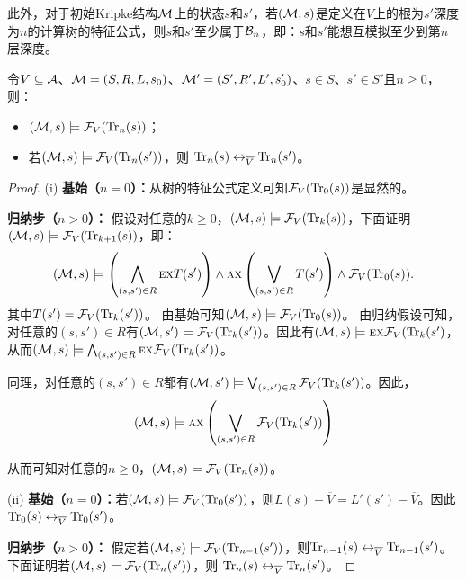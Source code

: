 此外，对于初始Kripke结构${\cal M}$上的状态$s$和$s'$，若$({\cal M},s)$是定义在$V$上的根为$s'$深度为$n$的计算树的特征公式，则$s$和$s'$至少属于${\cal B}_n$，即：$s$和$s'$能想互模拟至少到第$n$层深度。

\begin{lemma}\label{Bn:to:Tn}
	令$V\subseteq {\cal A}$、${\cal M}=(S, R, L,s_0)$、${\cal M}'=(S', R', L',s_0')$、$s\in S$、$s'\in S'$且$n\ge 0$，则：
	\begin{itemize}
		\item[(i)] $({\cal M},s)\models{\cal F}_V(\textrm{Tr}_n(s))$；
		\item[(ii)] 若$({\cal M},s)\models{\cal F}_V(\textrm{Tr}_n(s'))$，则
		$\textrm{Tr}_n(s) \leftrightarrow_{\overline V} \textrm{Tr}_n(s')$。
	\end{itemize}
\end{lemma}
\begin{proof}
	(i) \textbf{基始（$n=0$）：}从树的特征公式定义可知${\cal F}_V(\textrm{Tr}_0(s))$是显然的。
	
	\textbf{归纳步（$n>0$）：} 假设对任意的$k\geq 0$，$({\cal M},s)\models{\cal F}_V(\textrm{Tr}_k(s))$，下面证明$({\cal M},s)\models{\cal F}_V(\textrm{Tr}_{k+1}(s))$，即：
	\begin{equation*}
		({\cal M},s)\models \left(\bigwedge_{(s,s')\in R}
		\textsc{e} \textsc{x} T(s')\right)
		\wedge \textsc{a} \textsc{x}\left(\bigvee_{(s,s')\in R}
		T(s')\right)
		\wedge {\cal F}_V(\textrm{Tr}_0(s)).
	\end{equation*}
	其中$T(s') ={\cal F}_V(\textrm{Tr}_k(s'))$。 
	由基始可知$({\cal M},s)\models {\cal F}_V(\textrm{Tr}_0(s))$。
	由归纳假设可知，对任意的$(s,s') \in R$有$({\cal M}, s') \models {\cal F}_V(\textrm{Tr}_k(s'))$。因此有$({\cal M},s)\models \textsc{e} \textsc{x} {\cal F}_V(\textrm{Tr}_k(s')$，从而$({\cal M},s)\models \bigwedge_{(s,s')\in R}
	\textsc{e} \textsc{x} {\cal F}_V(\textrm{Tr}_k(s'))$。
	
	同理，对任意的$(s,s') \in R$都有$({\cal M}, s') \models \bigvee_{(s,s')\in R} {\cal F}_V(\textrm{Tr}_k(s') )$。因此，
	$$({\cal M},s)\models \textsc{a} \textsc{x}\left(\bigvee_{(s,s')\in R}
	{\cal F}_V(\textrm{Tr}_k(s') )\right)$$
	
	从而可知对任意的$n\geq 0$，$({\cal M},s)\models{\cal F}_V(\textrm{Tr}_n(s))$。
	
	
	
	(ii) \textbf{基始（$n=0$）：}若$({\cal M}, s)  \models {\cal F}_V(\textrm{Tr}_0(s'))$，则$L(s) - \overline V = L'(s') - \overline V$。因此$\textrm{Tr}_0(s) \leftrightarrow_{\overline V} \textrm{Tr}_0(s')$。
	
	\textbf{归纳步（$n>0$）：} 假定若$({\cal M},s)\models{\cal F}_V(\textrm{Tr}_{n-1}(s'))$，则$\textrm{Tr}_{n-1}(s) \leftrightarrow_{\overline V} \textrm{Tr}_{n-1}(s')$。下面证明若$({\cal M},s)\models{\cal F}_V(\textrm{Tr}_n(s'))$，则
	$\textrm{Tr}_n(s) \leftrightarrow_{\overline V} \textrm{Tr}_n(s')$。
	

\end{proof}
